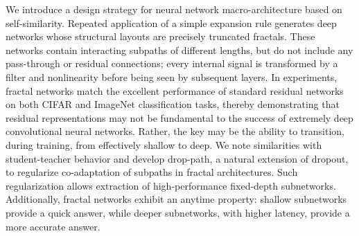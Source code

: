 We introduce a design strategy for neural network macro-architecture based on
self-similarity.  Repeated application of a simple expansion rule generates
deep networks whose structural layouts are precisely truncated fractals.  These
networks contain interacting subpaths of different lengths, but do not include
any pass-through or residual connections; every internal signal is transformed
by a filter and nonlinearity before being seen by subsequent layers.  In
experiments, fractal networks match the excellent performance of standard
residual networks on both CIFAR and ImageNet classification tasks, thereby
demonstrating that residual representations may not be fundamental to the
success of extremely deep convolutional neural networks.  Rather, the key may
be the ability to transition, during training, from effectively shallow to
deep.  We note similarities with student-teacher behavior and develop
drop-path, a natural extension of dropout, to regularize co-adaptation of
subpaths in fractal architectures.  Such regularization allows extraction of
high-performance fixed-depth subnetworks.  Additionally, fractal networks
exhibit an anytime property: shallow subnetworks provide a quick answer, while
deeper subnetworks, with higher latency, provide a more accurate answer.
